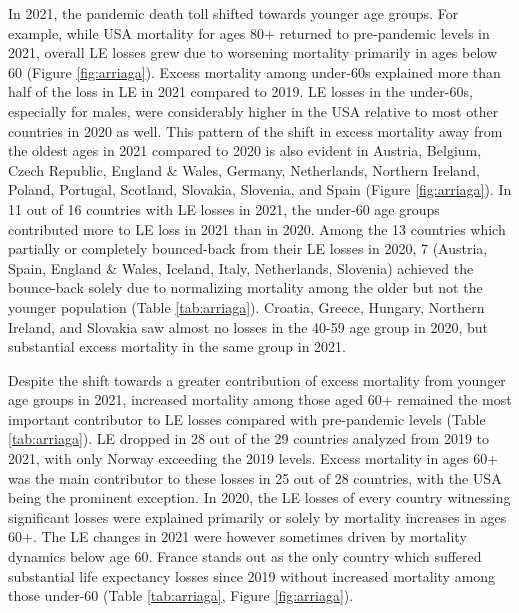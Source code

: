 \documentclass[12pt]{article}
\begin{document}
In 2021, the pandemic death toll shifted towards younger age groups. For example, while USA mortality for ages 80+ returned to pre-pandemic levels in 2021, overall LE losses grew due to worsening mortality primarily in ages below 60 (Figure \ref{fig:arriaga}). Excess mortality among under-60s explained more than half of the loss in LE in 2021 compared to 2019. LE losses in the under-60s, especially for males, were considerably higher in the USA relative to most other countries in 2020 as well.\citealp{Aburto2021b} This pattern of the shift in excess mortality away from the oldest ages in 2021 compared to 2020 is also evident in Austria, Belgium, Czech Republic, England \& Wales, Germany, Netherlands, Northern Ireland, Poland, Portugal, Scotland, Slovakia, Slovenia, and Spain (Figure \ref{fig:arriaga}). In 11 out of 16 countries with LE losses in 2021, the under-60 age groups contributed more to LE loss in 2021 than in 2020. Among the 13 countries which partially or completely bounced-back from their LE losses in 2020, 7 (Austria, Spain, England \& Wales, Iceland, Italy, Netherlands, Slovenia) achieved the bounce-back solely due to normalizing mortality among the older but not the younger population (Table \ref{tab:arriaga}). Croatia, Greece, Hungary, Northern Ireland, and Slovakia saw almost no losses in the 40-59 age group in 2020, but substantial excess mortality in the same group in 2021.

Despite the shift towards a greater contribution of excess mortality from younger age groups in 2021, increased mortality among those aged 60+ remained the most important contributor to LE losses compared with pre-pandemic levels (Table \ref{tab:arriaga}). LE dropped in 28 out of the 29 countries analyzed from 2019 to 2021, with only Norway exceeding the 2019 levels. Excess mortality in ages 60+ was the main contributor to these losses in 25 out of 28 countries, with the USA being the prominent exception. In 2020, the LE losses of every country witnessing significant losses were explained primarily or solely by mortality increases in ages 60+. The LE changes in 2021 were however sometimes driven by mortality dynamics below age 60. France stands out as the only country which suffered substantial life expectancy losses since 2019 without increased mortality among those under-60 (Table \ref{tab:arriaga}, Figure \ref{fig:arriaga}).
\end{document}
